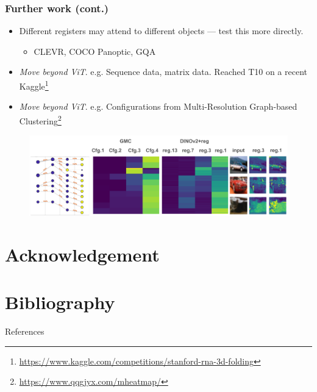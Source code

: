 \documentclass[aspectratio=169]{beamer}
\begin{document}
\begin{frame}
\frametitle{Further work (cont.)}

\begin{itemize}
    \item Different registers may attend to different objects — test this more directly.
    \begin{itemize}
        \item CLEVR, COCO Panoptic, GQA
    \end{itemize}
    \item \emph{Move beyond ViT}. e.g. Sequence data, matrix data. Reached T10 on a recent Kaggle\footnote{\url{https://www.kaggle.com/competitions/stanford-rna-3d-folding}}
    \item \emph{Move beyond ViT}. e.g. Configurations from Multi-Resolution Graph-based Clustering\footnote{\url{https://www.qqgjyx.com/mheatmap/}}
\end{itemize}
\vspace{-2em}
\begin{figure}[t]
    \centering
    \includegraphics[width=\textwidth]{figures/cifar10_attnmap.png}
\end{figure}
\end{frame}




\section*{Acknowledgement}



\section*{Bibliography}
\appendix

\begin{frame}{References}
    \printbibliography[heading=none]
\end{frame}
\end{document}
